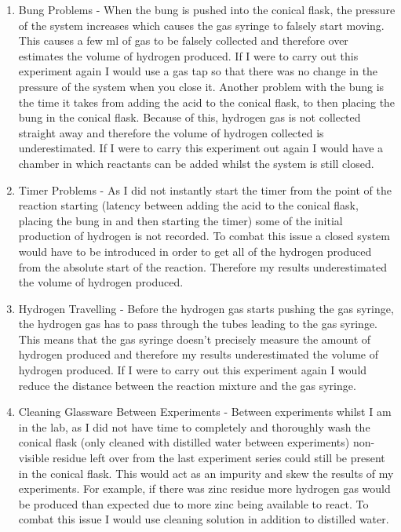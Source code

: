 \begin{enumerate}
\item Bung Problems - When the bung is pushed into the conical flask, the pressure of the system increases which causes the gas syringe to falsely start moving. This causes a few ml of gas to be falsely collected and therefore over estimates the volume of hydrogen produced. If I were to carry out this experiment again I would use a gas tap so that there was no change in the pressure of the system when you close it. Another problem with the bung is the time it takes from adding the acid to the conical flask, to then placing the bung in the conical flask. Because of this, hydrogen gas is not collected straight away and therefore the volume of hydrogen collected is underestimated. If I were to carry this experiment out again I would have a chamber in which reactants can be added whilst the system is still closed.

\item Timer Problems - As I did not instantly start the timer from the point of the reaction starting (latency between adding the acid to the conical flask, placing the bung in and then starting the timer) some of the initial production of hydrogen is not recorded. To combat this issue a closed system would have to be introduced in order to get all of the hydrogen produced from the absolute start of the reaction. Therefore my results underestimated the volume of hydrogen produced.

\item Hydrogen Travelling - Before the hydrogen gas starts pushing the gas syringe, the hydrogen gas has to pass through the tubes leading to the gas syringe. This means that the gas syringe doesn't precisely measure the amount of hydrogen produced and therefore my results underestimated the volume of hydrogen produced. If I were to carry out this experiment again I would reduce the distance between the reaction mixture and the gas syringe.

\item Cleaning Glassware Between Experiments - Between experiments whilst I am in the lab, as I did not have time to completely and thoroughly wash the conical flask (only cleaned with distilled water between experiments) non-visible residue left over from the last experiment series could still be present in the conical flask. This would act as an impurity and skew the results of my experiments. For example, if there was zinc residue more hydrogen gas would be produced than expected due to more zinc being available to react. To combat this issue I would use cleaning solution in addition to distilled water.
\end{enumerate}